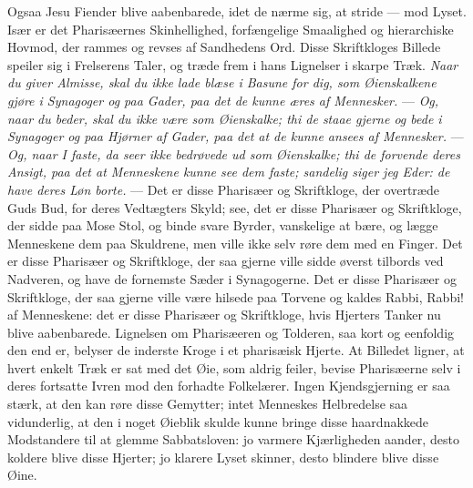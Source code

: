\documentclass[12pt,a4paper]{book}
\begin{document}
Ogsaa Jesu Fiender blive aabenbarede, idet de nærme sig, at stride --- mod Lyset. Især er
det Pharisæernes Skinhellighed, forfængelige Smaalighed og hierarchiske Hovmod, der rammes
og revses af Sandhedens Ord. Disse Skriftkloges Billede speiler sig i Frelserens Taler, og
træde frem i hans Lignelser i skarpe Træk. \emph{Naar du giver Almisse, skal du ikke lade
blæse i Basune for dig, som Øienskalkene gjøre i Synagoger og paa Gader, paa det de kunne
æres af Mennesker.} --- \emph{Og, naar du beder, skal du ikke være som Øienskalke; thi de
staae gjerne og bede i Synagoger og paa Hjørner af Gader, paa det at de kunne ansees af
Mennesker.} --- \emph{Og, naar I faste, da seer ikke bedrøvede ud som Øienskalke; thi de
forvende deres Ansigt, paa det at Menneskene kunne see dem faste; sandelig siger jeg Eder:
de have deres Løn borte.} --- Det er disse Pharisæer og Skriftkloge, der overtræde Guds
Bud, for deres Vedtægters Skyld;
see, det er disse Pharisæer og Skriftkloge, der sidde paa Mose Stol, og binde svare Byrder,
vanskelige at bære, og lægge Menneskene dem paa Skuldrene, men ville ikke selv røre dem med
en Finger. Det er disse Pharisæer og Skriftkloge, der saa gjerne ville sidde øverst tilbords
ved Nadveren, og have de fornemste Sæder i Synagogerne. Det er disse Pharisæer og
Skriftkloge, der saa gjerne ville være hilsede paa Torvene og kaldes Rabbi, Rabbi! af
Menneskene: det er disse Pharisæer og Skriftkloge, hvis Hjerters Tanker nu blive
aabenbarede. Lignelsen om Pharisæeren og Tolderen, saa kort og eenfoldig den end er, belyser
de inderste Kroge i et pharisæisk Hjerte. At Billedet ligner, at hvert enkelt Træk er sat
med det Øie, som aldrig feiler, bevise Pharisæerne selv i deres fortsatte Ivren mod den
forhadte Folkelærer. Ingen Kjendsgjerning er saa stærk, at den kan røre disse Gemytter;
intet Menneskes Helbredelse saa vidunderlig, at den i noget Øieblik skulde kunne bringe
disse haardnakkede Modstandere til at glemme Sabbatsloven: jo varmere Kjærligheden aander,
desto koldere blive disse Hjerter; jo klarere Lyset skinner, desto blindere blive disse
Øine.
\end{document}
